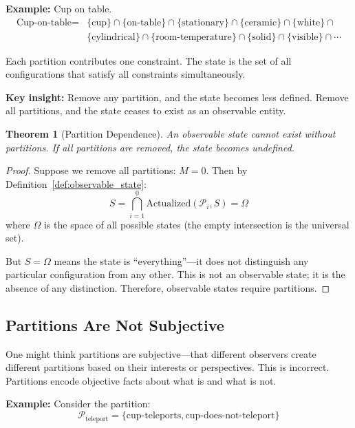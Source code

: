 \documentclass[twocolumn,10pt]{article}
\newtheorem{theorem}{Theorem}[section]
\theoremstyle{definition}
\theoremstyle{remark}
\begin{document}
\noindent\textbf{Example:} Cup on table.
\begin{align}
\text{Cup-on-table} = &\{\text{cup}\} \cap \{\text{on-table}\} \cap \{\text{stationary}\} \cap \{\text{ceramic}\} \cap \{\text{white}\} \cap \\
&\{\text{cylindrical}\} \cap \{\text{room-temperature}\} \cap \{\text{solid}\} \cap \{\text{visible}\} \cap \cdots
\end{align}

\noindent Each partition contributes one constraint. The state is the set of all configurations that satisfy all constraints simultaneously.

\vspace{0.2cm}
\noindent\textbf{Key insight:} Remove any partition, and the state becomes less defined. Remove all partitions, and the state ceases to exist as an observable entity.

\begin{theorem}[Partition Dependence]
\label{thm:partition_dependence}
An observable state cannot exist without partitions. If all partitions are removed, the state becomes undefined.
\end{theorem}

\begin{proof}
Suppose we remove all partitions: $M = 0$. Then by Definition~\ref{def:observable_state}:
\begin{equation}
S = \bigcap_{i=1}^{0} \text{Actualized}(\mathcal{P}_i, S) = \Omega
\end{equation}
where $\Omega$ is the space of all possible states (the empty intersection is the universal set). 

But $S = \Omega$ means the state is ``everything''—it does not distinguish any particular configuration from any other. This is not an observable state; it is the absence of any distinction. Therefore, observable states require partitions.
\end{proof}

\subsection{Partitions Are Not Subjective}

One might think partitions are subjective—that different observers create different partitions based on their interests or perspectives. This is incorrect. Partitions encode objective facts about what is and what is not.

\vspace{0.2cm}
\noindent\textbf{Example:} Consider the partition:
\begin{equation}
\mathcal{P}_{\text{teleport}} = \{\text{cup-teleports}, \text{cup-does-not-teleport}\}
\end{equation}
\end{document}
